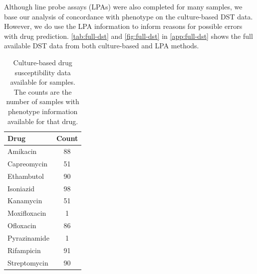 Although line probe assays (LPAs) were also completed for many samples, we base our analysis of concordance with phenotype on the culture-based DST data. However, we do use the LPA information to inform reasons for possible errors with drug prediction. \autoref{tab:full-dst} and \autoref{fig:full-dst} in \autoref{app:full-dst} shows the full available DST data from both culture-based and LPA methods.

\begin{table}
\centering
\begin{tabular}{|l|c|}
\hline
Drug         & Count \\ \hline
Amikacin     & 88    \\ \hline
Capreomycin  & 51    \\ \hline
Ethambutol   & 90    \\ \hline
Isoniazid    & 98    \\ \hline
Kanamycin    & 51    \\ \hline
Moxifloxacin & 1     \\ \hline
Ofloxacin    & 86    \\ \hline
Pyrazinamide & 1     \\ \hline
Rifampicin   & 91    \\ \hline
Streptomycin & 90    \\ \hline
\end{tabular}
\caption{Culture-based drug susceptibility data available for samples. The counts are the number of samples with phenotype information available for that drug.}
\label{tab:available-dst}
\end{table}

